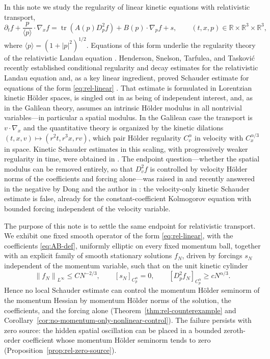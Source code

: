 \documentclass[11pt,reqno]{amsart}
\numberwithin{equation}{section}
\theoremstyle{remark}
\DeclareMathOperator{\tr}{tr}
\newcommand{\R}{\mathbb R}
\newcommand{\norm}[1]{\left\|#1\right\|}
\newcommand{\la}[1]{\langle #1\rangle}
\begin{document}
In this note we study the regularity of linear kinetic equations with relativistic transport,
\begin{equation}\label{eq:rel-linear}
   \partial_t f+\frac{p}{\la p}\cdot\nabla_x f
   =\tr\!\left(A(p)D_p^2f\right)+B(p)\cdot\nabla_pf+s,
   \qquad (t,x,p)\in\R\times\R^3\times\R^3,
\end{equation}
where $\la p=(1+|p|^2)^{1/2}$.  Equations of this form underlie the regularity theory of the relativistic Landau equation \cite{SG04,ST19}.  Henderson, Snelson, Tarfulea, and Taskovi\'c \cite{HSTT} recently established conditional regularity and decay estimates for the relativistic Landau equation and, as a key linear ingredient, proved  Schauder estimate for equations of the form \eqref{eq:rel-linear} \cite[Theorem~6.5]{HSTT}.  That estimate is formulated in Lorentzian kinetic H\"older spaces, is singled out in \cite{HSTT} as being of independent interest, and, as in the Galilean theory, assumes an intrinsic H\"older modulus in all nontrivial variables---in particular a spatial modulus. In the Galilean case the transport is $v\cdot\nabla_x$ and the quantitative theory is organized by the kinetic dilations $(t,x,v)\mapsto(r^2t,r^3x,rv)$, which pair H\"older regularity $C_v^\alpha$ in velocity with $C_x^{\alpha/3}$ in space.  Kinetic Schauder estimates in this scaling, with progressively weaker regularity in time, were obtained in \cite{IM21,HW24,BB24,LPP23,DY25}.  The endpoint question---whether the spatial modulus can be removed entirely, so that $D_v^2f$ is controlled by velocity H\"older norms of the coefficients and forcing alone---was raised in \cite[Conjecture~1.3]{HW24} and recently answered in the negative by Dong and the author in \cite{DW26}: the velocity-only kinetic Schauder estimate is false, already for the constant-coefficient Kolmogorov equation with bounded forcing independent of the velocity variable.

The purpose of this note is to settle the same endpoint for relativistic transport.  We exhibit one fixed smooth operator of the form \eqref{eq:rel-linear}, with the coefficients \eqref{eq:AB-def}, uniformly elliptic on every fixed momentum ball, together with an explicit family of smooth stationary solutions $f_N$, driven by forcings $s_N$ independent of the momentum variable, such that on the unit kinetic cylinder
\[
   \norm{f_N}_{L^\infty}\le CN^{-2/3},
   \qquad
   [s_N]_{C_p^\alpha}=0,
   \qquad
   [D_p^2f_N]_{C_p^\alpha}\ge cN^{\alpha/3}.
\]
Hence no local Schauder estimate can control the momentum H\"older seminorm of the momentum Hessian by momentum H\"older norms of the solution, the coefficients, and the forcing alone (Theorem~\ref{thm:rel-counterexample} and Corollary~\ref{cor:no-momentum-only-nonlinear-control}).  The failure persists with zero source: the hidden spatial oscillation can be placed in a bounded zeroth-order coefficient whose momentum H\"older seminorm tends to zero (Proposition~\ref{prop:rel-zero-source}).
\end{document}
